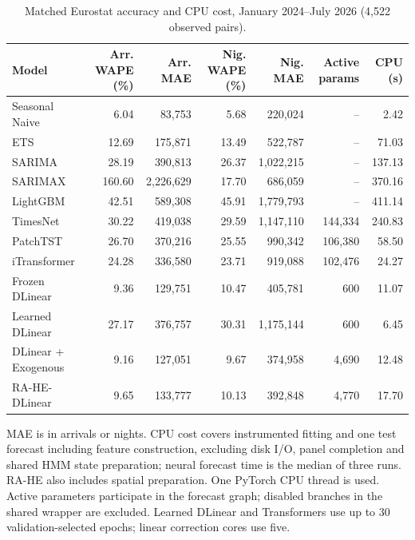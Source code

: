 \begin{table}[!t]
\centering
\caption{Matched Eurostat accuracy and CPU cost, January 2024--July 2026 (4,522 observed pairs).}
\label{tab:section4_benchmark}
\footnotesize
\setlength{\tabcolsep}{3pt}
\renewcommand{\arraystretch}{1.08}
\begin{tabular}{@{}lrrrrrr@{}}
\toprule
\textbf{Model} & \textbf{Arr. WAPE (\%)} & \textbf{Arr. MAE} & \textbf{Nig. WAPE (\%)} & \textbf{Nig. MAE} & \textbf{Active params} & \textbf{CPU (s)} \\
\midrule
Seasonal Naive & 6.04 & 83,753 & 5.68 & 220,024 & -- & 2.42 \\
ETS & 12.69 & 175,871 & 13.49 & 522,787 & -- & 71.03 \\
SARIMA & 28.19 & 390,813 & 26.37 & 1,022,215 & -- & 137.13 \\
SARIMAX & 160.60 & 2,226,629 & 17.70 & 686,059 & -- & 370.16 \\
LightGBM & 42.51 & 589,308 & 45.91 & 1,779,793 & -- & 411.14 \\
TimesNet & 30.22 & 419,038 & 29.59 & 1,147,110 & 144,334 & 240.83 \\
PatchTST & 26.70 & 370,216 & 25.55 & 990,342 & 106,380 & 58.50 \\
iTransformer & 24.28 & 336,580 & 23.71 & 919,088 & 102,476 & 24.27 \\
Frozen DLinear & 9.36 & 129,751 & 10.47 & 405,781 & 600 & 11.07 \\
Learned DLinear & 27.17 & 376,757 & 30.31 & 1,175,144 & 600 & 6.45 \\
DLinear + Exogenous & 9.16 & 127,051 & 9.67 & 374,958 & 4,690 & 12.48 \\
RA-HE-DLinear & 9.65 & 133,777 & 10.13 & 392,848 & 4,770 & 17.70 \\
\bottomrule
\end{tabular}
\par\vspace{3pt}
\begin{minipage}{\textwidth}
\scriptsize\raggedright MAE is in arrivals or nights. CPU cost covers instrumented fitting and one test forecast including feature construction, excluding disk I/O, panel completion and shared HMM state preparation; neural forecast time is the median of three runs. RA-HE also includes spatial preparation. One PyTorch CPU thread is used. Active parameters participate in the forecast graph; disabled branches in the shared wrapper are excluded. Learned DLinear and Transformers use up to 30 validation-selected epochs; linear correction cores use five.
\end{minipage}
\end{table}
